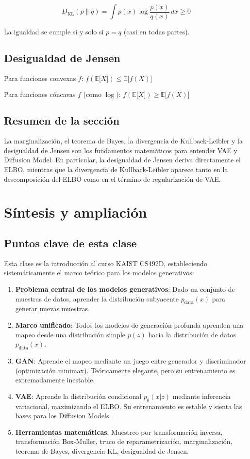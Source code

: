 \documentclass[a4paper]{article}
\begin{document}
$$D_{\mathrm{KL}}(p \| q) = \int p(x) \log \frac{p(x)}{q(x)} \, dx \geq 0$$

La igualdad se cumple si y solo si $p = q$ (casi en todas partes).

\subsection{Desigualdad de Jensen}

Para funciones convexas $f$: $f(\mathbb{E}{[}X{]}) \leq \mathbb{E}{[}f(X){]}$

Para funciones cóncavas $f$ (como $\log$): $f(\mathbb{E}{[}X{]}) \geq \mathbb{E}{[}f(X){]}$

\subsection{Resumen de la sección}

La marginalización, el teorema de Bayes, la divergencia de Kullback-Leibler y la desigualdad de Jensen son los fundamentos matemáticos para entender VAE y Diffusion Model. En particular, la desigualdad de Jensen deriva directamente el ELBO, mientras que la divergencia de Kullback-Leibler aparece tanto en la descomposición del ELBO como en el término de regularización de VAE.

\newpage
\section{Síntesis y ampliación}

\subsection{Puntos clave de esta clase}

Esta clase es la introducción al curso KAIST CS492D, estableciendo sistemáticamente el marco teórico para los modelos generativos:

\begin{enumerate}
    \item \textbf{Problema central de los modelos generativos}: Dado un conjunto de muestras de datos, aprender la distribución subyacente $p_{\text{data}}(x)$ para generar nuevas muestras.
    \item \textbf{Marco unificado}: Todos los modelos de generación profunda aprenden una mapeo desde una distribución simple $p(z)$ hacia la distribución de datos $p_{\text{data}}(x)$.
    \item \textbf{GAN}: Aprende el mapeo mediante un juego entre generador y discriminador (optimización minimax). Teóricamente elegante, pero su entrenamiento es extremadamente inestable.
    \item \textbf{VAE}: Aprende la distribución condicional $p_\theta(x|z)$ mediante inferencia variacional, maximizando el ELBO. Su entrenamiento es estable y sienta las bases para los Diffusion Models.
    \item \textbf{Herramientas matemáticas}: Muestreo por transformación inversa, transformación Box-Muller, truco de reparametrización, marginalización, teorema de Bayes, divergencia KL, desigualdad de Jensen.
\end{enumerate}
\end{document}
